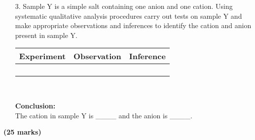 \begin{enumerate}
\raggedright

\item[3.] Sample Y is a simple salt containing one anion and one cation. Using systematic qualitative analysis procedures carry out tests on sample Y and make appropriate observations and inferences to identify the cation and anion present in sample Y.\\

\begin{center}
\begin{tabular}{|p{4cm}|p{4cm}|p{4cm}|}
\hline
\textbf{Experiment}&\textbf{Observation}&\textbf{Inference}\\ \hline
&&\\
&&\\
&&\\
&&\\
\hline
\end{tabular}\\
\end{center}

\textbf{Conclusion:}\\
\vspace{6pt}
The cation in sample Y is \_\_\_\_ and the anion is \_\_\_\_.\\

\end{enumerate}

\raggedleft \textbf{(25 marks)}\\

\raggedright
